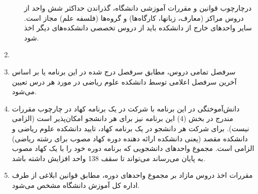\documentclass{article}
\begin{document}
\begin{enumerate}
\begin{enumerate}
				درچارچوب قوانین و مقررات آموزشی دانشگاه، گذراندن حداکثر شش واحد از دروس مراکز (معارف، زبانها، کارگاه‌ها) و گروه‌ها (فلسفه علم) مجاز است. سایر واحدهای خارج از دانشکده باید از دروس تخصصی دانشکده‌های دیگر اخذ شود.
			\end{enumerate}
        \item
         \item
			سرفصل تمامی دروس، مطابق سرفصل درج شده در این برنامه یا بر اساس آخرین سرفصل اعلامی توسط دانشکده علوم ریاضی در مورد هر درس تعیین می‌شود.
         \item
			دانش‌آموختگی در این برنامه با شرکت در یک برنامه کهاد در چارچوب مقررات مندرج در بخش (4) این برنامه نیز برای هر دانشجو امکان‌پذیر است (الزامی نیست). برای شرکت هر دانشجو در یک برنامه کهاد، تایید دانشکده علوم ریاضی و دانشکده مقصد (یعنی دانشکده ارائه دهنده دوره کهاد مصوب برای رشته ریاضی) الزامی است. مجموع واحدهای دانشجویی که برنامه دوره خود را با یک کهاد مصوب به پایان می‌رساند می‌تواند تا سقف 138 واحد افزایش داشته باشد.
         \item
			مقررات اخذ دروس مازاد بر مجموع واحدهای دوره، مطابق قوانین ابلاغی از طرف اداره کل آموزش دانشگاه مشخص می‌شود.

    \end{enumerate}

\pagebreak
\end{document}
